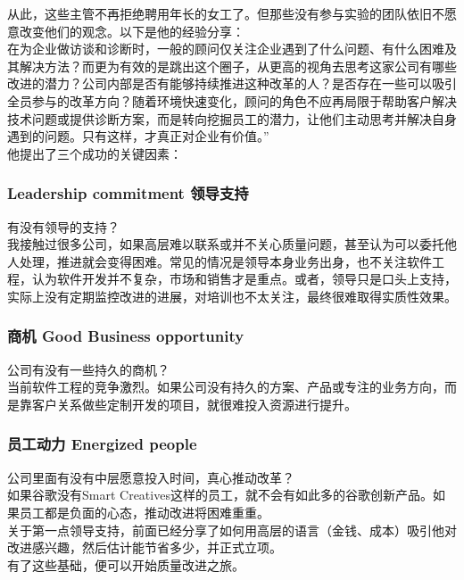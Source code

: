 从此，这些主管不再拒绝聘用年长的女工了。但那些没有参与实验的团队依旧不愿意改变他们的观念。以下是他的经验分享：\\
在为企业做访谈和诊断时，一般的顾问仅关注企业遇到了什么问题、有什么困难及其解决方法？而更为有效的是跳出这个圈子，从更高的视角去思考这家公司有哪些改进的潜力？公司内部是否有能够持续推进这种改革的人？是否存在一些可以吸引全员参与的改革方向？随着环境快速变化，顾问的角色不应再局限于帮助客户解决技术问题或提供诊断方案，而是转向挖掘员工的潜力，让他们主动思考并解决自身遇到的问题。只有这样，才真正对企业有价值。''\\
他提出了三个成功的关键因素：

\hypertarget{leadership-commitment-ux9886ux5bfcux652fux6301}{%
\subsubsection{Leadership commitment
领导支持}\label{leadership-commitment-ux9886ux5bfcux652fux6301}}

有没有领导的支持？\\
我接触过很多公司，如果高层难以联系或并不关心质量问题，甚至认为可以委托他人处理，推进就会变得困难。常见的情况是领导本身业务出身，也不关注软件工程，认为软件开发并不复杂，市场和销售才是重点。或者，领导只是口头上支持，实际上没有定期监控改进的进展，对培训也不太关注，最终很难取得实质性效果。

\hypertarget{ux5546ux673a-good-business-opportunity}{%
\subsubsection{商机 Good Business
opportunity}\label{ux5546ux673a-good-business-opportunity}}

公司有没有一些持久的商机？\\
当前软件工程的竞争激烈。如果公司没有持久的方案、产品或专注的业务方向，而是靠客户关系做些定制开发的项目，就很难投入资源进行提升。

\hypertarget{ux5458ux5de5ux52a8ux529b-energized-people}{%
\subsubsection{员工动力 Energized
people}\label{ux5458ux5de5ux52a8ux529b-energized-people}}

公司里面有没有中层愿意投入时间，真心推动改革？\\
如果谷歌没有Smart
Creatives这样的员工，就不会有如此多的谷歌创新产品。如果员工都是负面的心态，推动改进将困难重重。\\
关于第一点领导支持，前面已经分享了如何用高层的语言（金钱、成本）吸引他对改进感兴趣，然后估计能节省多少，并正式立项。\\
有了这些基础，便可以开始质量改进之旅。

